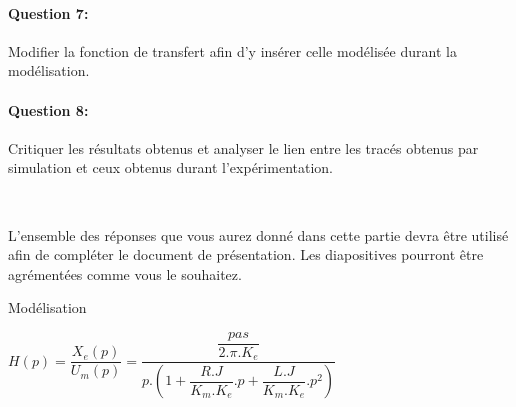\paragraph{Question 7:} Modifier la fonction de transfert afin d'y insérer celle modélisée durant la modélisation.

\paragraph{Question 8:} Critiquer les résultats obtenus et analyser le lien entre les tracés obtenus par simulation et ceux obtenus durant l'expérimentation.

~\

L'ensemble des réponses que vous aurez donné dans cette partie devra être utilisé afin de compléter le document de présentation. Les diapositives pourront être agrémentées comme vous le souhaitez.

\ifdef{\public}{}{}

\newpage

\pagestyle{correction}\setcounter{section}{0}

Modélisation
\begin{center}
$H(p)=\dfrac{X_e(p)}{U_m(p)}=\dfrac{\dfrac{pas}{2.\pi.K_e}}{p.\left(1+\dfrac{R.J}{K_m.K_e}.p+\dfrac{L.J}{K_m.K_e}.p^2\right)}$
\end{center}

